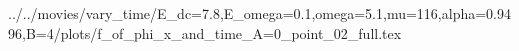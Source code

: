 ../../movies/vary_time/E_dc=7.8,E_omega=0.1,omega=5.1,mu=116,alpha=0.9496,B=4/plots/f_of_phi_x_and_time_A=0_point_02_full.tex